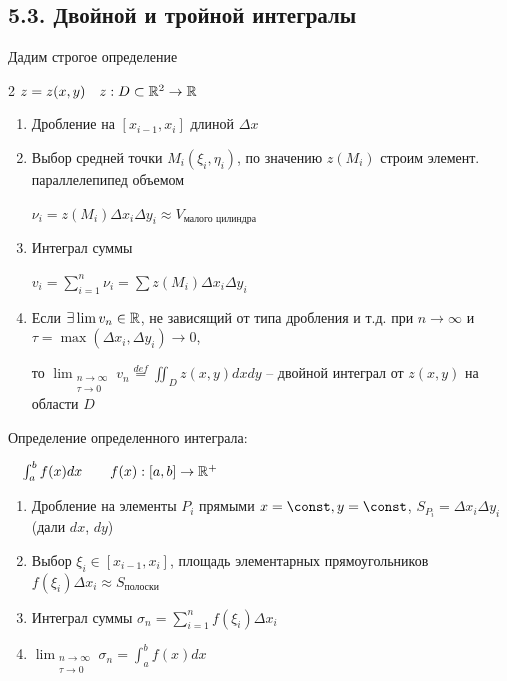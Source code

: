 \documentclass[12pt]{article}
\begin{document}
    \subsection{5.3. Двойной и тройной интегралы}

    \hypertarget{doubleintegral}{}

    \Nota Дадим строгое определение

    \begin{multicols}{2}
        \Defs $z = z(x, y) \quad z : D \subset \mathbb{R}^2 \rightarrow \mathbb{R}$
        
        \begin{enumerate}
            \item Дробление на $[x_{i-1}, x_i]$ длиной $\Delta x$

            \item Выбор средней точки $M_i(\xi_i, \eta_i)$, по значению $z(M_i)$ строим элемент. параллелепипед объемом

            $\nu_i = z(M_i) \Delta x_i \Delta y_i \approx V_{\text{малого цилиндра}}$
            
            \item Интеграл суммы

            $v_i = \sum_{i=1}^n \nu_i = \sum z(M_i) \Delta x_i \Delta y_i$
            
            \item Если $\exists \lim v_n \in \mathbb{R}$, не зависящий от типа дробления и т.д. при $n \rightarrow \infty$ и
            $\tau = \max (\Delta x_i, \Delta y_i) \to 0$,
    
            то $\lim_{\substack{n\to\infty \\ \tau \to 0}} v_n \stackrel{def}{=} \iint_D z(x, y) dx dy$ -- двойной интеграл от $z(x, y)$ на области $D$
        \end{enumerate}

        \mediumvspace

        \Mems Определение определенного интеграла:
        
        $\quad \int_a^b f(x) dx \quad\quad f(x) : [a, b] \rightarrow \mathbb{R}^+$ \\
        
        \begin{enumerate}
            \item Дробление на элементы $P_i$ прямыми $x = \const, y = \const$, $S_{P_i} = \Delta x_i \Delta y_i$ (дали $dx$, $dy$)
            \item Выбор $\xi_i \in [x_{i-1}, x_i]$, площадь элементарных прямоугольников $f(\xi_i)\Delta x_i \approx S_{\text{полоски}}$
            \item Интеграл суммы $\sigma_n = \sum_{i=1}^n f(\xi_i) \Delta x_i$
            \item $\lim_{\substack{n\to\infty \\ \tau \to 0}} \sigma_n = \int^b_a f(x) dx$
        \end{enumerate}

        
    \end{multicols}
\end{document}

